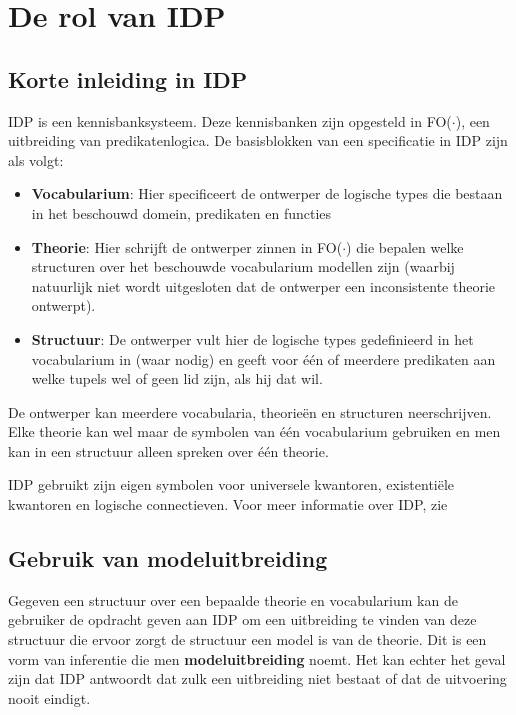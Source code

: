\section{De rol van IDP}\label{sec:rol-idp}
\subsection{Korte inleiding in IDP}
IDP is een kennisbanksysteem. Deze kennisbanken zijn opgesteld in FO($\cdot$), een uitbreiding van predikatenlogica. De basisblokken van een specificatie in IDP zijn als volgt:

\begin{itemize}
	\item \textbf{Vocabularium}: Hier specificeert de ontwerper de logische types die bestaan in het beschouwd domein, predikaten en functies
	\item \textbf{Theorie}: Hier schrijft de ontwerper zinnen in FO($\cdot$) die bepalen welke structuren over het beschouwde vocabularium modellen zijn (waarbij natuurlijk niet wordt uitgesloten dat de ontwerper een inconsistente theorie ontwerpt).
	\item \textbf{Structuur}: De ontwerper vult hier de logische types gedefinieerd in het vocabularium in (waar nodig) en geeft voor \'e\'en of meerdere predikaten aan welke tupels wel of geen lid zijn, als hij dat wil.
\end{itemize}

De ontwerper kan meerdere vocabularia, theorie\"en en structuren neerschrijven. Elke theorie kan wel maar de symbolen van \'e\'en vocabularium gebruiken en men kan in een structuur alleen spreken over \'e\'en theorie.

IDP gebruikt zijn eigen symbolen voor universele kwantoren, existenti\"ele kwantoren en logische connectieven. Voor meer informatie over IDP, zie 

\subsection{Gebruik van modeluitbreiding}
Gegeven een structuur over een bepaalde theorie en vocabularium kan de gebruiker de opdracht geven aan IDP om een uitbreiding te vinden van deze structuur die ervoor zorgt de structuur een model is van de theorie. Dit is een vorm van inferentie die men \textbf{modeluitbreiding} noemt. Het kan echter het geval zijn dat IDP antwoordt dat zulk een uitbreiding niet bestaat of dat de uitvoering nooit eindigt.



